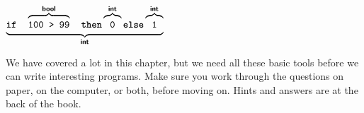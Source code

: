 \documentclass[]{book}
\newcommand{\smspace}{\vspace{4mm}}
\begin{document}

\smspace
$\underbrace{\vphantom{g}\texttt{\textbf{if}}\ \ \ \overbrace{\texttt{\strut 100 > 99}}^{\textbf{\textsf{bool}}}\ \ \ \texttt{\textbf{then}} \overbrace{\texttt{\strut 0}}^{\textbf{\textsf{int}}} \texttt{\textbf{else}} \overbrace{\texttt{\strut 1}}^{\textbf{\textsf{int}}}}_{\textsf{\textbf{int}}}$
\smspace

\noindent We have covered a lot in this chapter, but we need all these basic tools before we can write interesting programs. Make sure you work through the questions on paper, on the computer, or both, before moving on. Hints and answers are at the back of the book.

\clearpage
\end{document}
